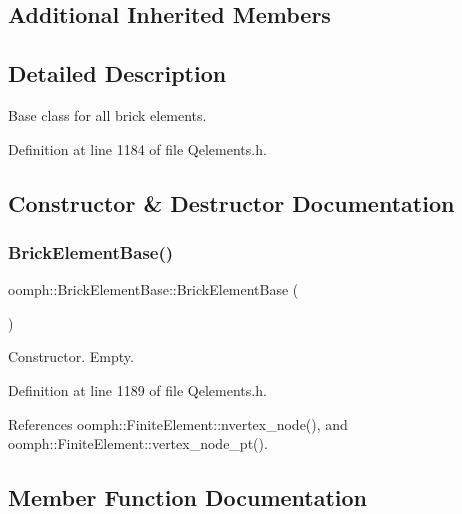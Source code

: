 \subsection*{Additional Inherited Members}


\subsection{Detailed Description}
Base class for all brick elements. 

Definition at line 1184 of file Qelements.\+h.



\subsection{Constructor \& Destructor Documentation}
\mbox{\label{classoomph_1_1BrickElementBase_a8c5b0bc251b34533c2be12aaeb212591}} 
\subsubsection{\texorpdfstring{Brick\+Element\+Base()}{BrickElementBase()}}
{\footnotesize\ttfamily oomph\+::\+Brick\+Element\+Base\+::\+Brick\+Element\+Base (\begin{DoxyParamCaption}{ }\end{DoxyParamCaption})\hspace{0.3cm}{\ttfamily [inline]}}



Constructor. Empty. 



Definition at line 1189 of file Qelements.\+h.



References oomph\+::\+Finite\+Element\+::nvertex\+\_\+node(), and oomph\+::\+Finite\+Element\+::vertex\+\_\+node\+\_\+pt().



\subsection{Member Function Documentation}
\mbox{\label{classoomph_1_1BrickElementBase_a8a2f954fea0650a9641c69614929cfa7}} 
